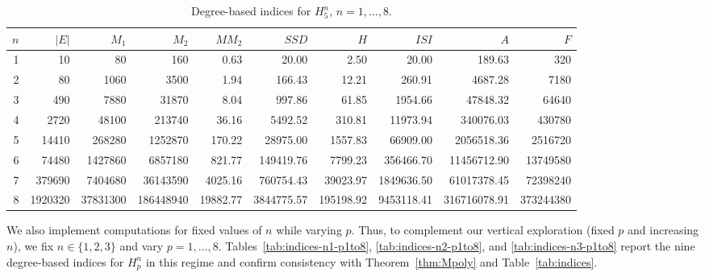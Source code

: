\documentclass[letterpaper,12pt]{article}
\begin{document}
\begin{table}
\vspace{.5cm}

\begin{tabular}{r|r r r r r r r r r}
\toprule
$n$ & $|E|$ & $M_1$ & $M_2$ & $MM_2$ & $SSD$ & $H$ & $ISI$ & $A$ & $F$ \\
\midrule
1 & 10 & 80 & 160 & 0.63 & 20.00 & 2.50 & 20.00 & 189.63 & 320 \\
2 & 80 & 1060 & 3500 & 1.94 & 166.43 & 12.21 & 260.91 & 4687.28 & 7180 \\
3 & 490 & 7880 & 31870 & 8.04 & 997.86 & 61.85 & 1954.66 & 47848.32 & 64640 \\
4 & 2720 & 48100 & 213740 & 36.16 & 5492.52 & 310.81 & 11973.94 & 340076.03 & 430780 \\
5 & 14410 & 268280 & 1252870 & 170.22 & 28975.00 & 1557.83 & 66909.00 & 2056518.36 & 2516720 \\
6 & 74480 & 1427860 & 6857180 & 821.77 & 149419.76 & 7799.23 & 356466.70 & 11456712.90 & 13749580 \\
7 & 379690 & 7404680 & 36143590 & 4025.16 & 760754.43 & 39023.97 & 1849636.50 & 61017378.45 & 72398240 \\
8 & 1920320 & 37831300 & 186448940 & 19882.77 & 3844775.57 & 195198.92 & 9453118.41 & 316716078.91 & 373244380 \\
\bottomrule
\end{tabular}
\caption{Degree-based indices for $H_{5}^{n}$, $n = 1, \dots, 8$.}
\label{tab:indices-H5n}
\end{table}
We also implement computations for fixed values of \(n\) while varying \(p\). 
Thus, to complement our vertical exploration (fixed \(p\) and increasing \(n\)), 
we fix \(n \in \{1,2,3\}\) and vary \(p = 1,\dots,8\). 
Tables~\ref{tab:indices-n1-p1to8}, \ref{tab:indices-n2-p1to8}, and \ref{tab:indices-n3-p1to8} 
report the nine degree-based indices for \(H_p^n\) in this regime and confirm 
consistency with Theorem~\ref{thm:Mpoly} and Table~\ref{tab:indices}.
\end{document}
